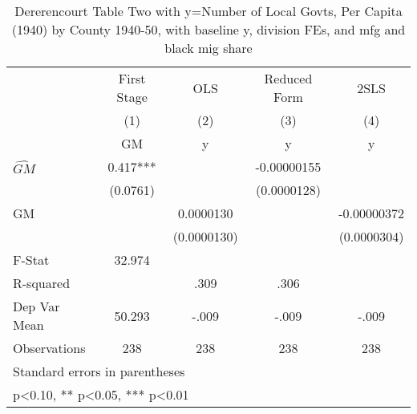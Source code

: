 \begin{table}[htbp]\centering
\def\sym#1{\ifmmode^{#1}\else\(^{#1}\)\fi}
\caption{Dererencourt Table Two with y=Number of Local Govts, Per Capita (1940) by County 1940-50, with baseline y, division FEs, and mfg and black mig share}
\begin{tabular}{l*{4}{c}}
\toprule
                    & First Stage   &         OLS   &Reduced Form   &        2SLS   \\
                    &\multicolumn{1}{c}{(1)}&\multicolumn{1}{c}{(2)}&\multicolumn{1}{c}{(3)}&\multicolumn{1}{c}{(4)}\\
                    &\multicolumn{1}{c}{GM}&\multicolumn{1}{c}{y}&\multicolumn{1}{c}{y}&\multicolumn{1}{c}{y}\\
\midrule
$\hat{GM}$          &       0.417***&               & -0.00000155   &               \\
                    &    (0.0761)   &               & (0.0000128)   &               \\
\addlinespace
GM                  &               &   0.0000130   &               & -0.00000372   \\
                    &               & (0.0000130)   &               & (0.0000304)   \\
\midrule
F-Stat              &      32.974   &               &               &               \\
R-squared           &               &        .309   &        .306   &               \\
Dep Var Mean        &      50.293   &       -.009   &       -.009   &       -.009   \\
Observations        &         238   &         238   &         238   &         238   \\
\bottomrule
\multicolumn{5}{l}{\footnotesize Standard errors in parentheses}\\
\multicolumn{5}{l}{\footnotesize * p<0.10, ** p<0.05, *** p<0.01}\\
\end{tabular}
\end{table}
